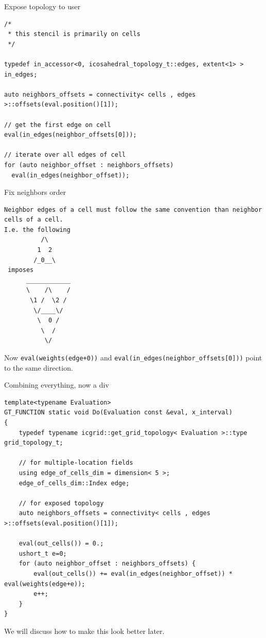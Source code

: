 \documentclass{beamer}
\begin{document}
\begin{frame}[fragile]{Expose topology to user}
  \begin{lstlisting}
/*
 * this stencil is primarily on cells
 */

typedef in_accessor<0, icosahedral_topology_t::edges, extent<1> > in_edges;

auto neighbors_offsets = connectivity< cells , edges >::offsets(eval.position()[1]);

// get the first edge on cell
eval(in_edges(neighbor_offsets[0]));

// iterate over all edges of cell
for (auto neighbor_offset : neighbors_offsets)
  eval(in_edges(neighbor_offset));
  \end{lstlisting}
\end{frame}

\begin{frame}[fragile]{Fix neighbors order}
  \begin{lstlisting}
Neighbor edges of a cell must follow the same convention than neighbor cells of a cell.
I.e. the following
          /\
         1  2
        /_0__\
 imposes
      ____________
      \    /\    /
       \1 /  \2 /
        \/____\/
         \  0 /
          \  /
           \/
  \end{lstlisting}
  Now \texttt{eval(weights(edge+0))} and \texttt{eval(in\_edges(neighbor\_offsets[0]))} point to the same direction.
\end{frame}

\begin{frame}[fragile]{Combining everything, now a div}
\begin{lstlisting}[basicstyle=\scriptsize\ttfamily]
template<typename Evaluation>
GT_FUNCTION static void Do(Evaluation const &eval, x_interval)
{
    typedef typename icgrid::get_grid_topology< Evaluation >::type grid_topology_t;

    // for multiple-location fields
    using edge_of_cells_dim = dimension< 5 >;
    edge_of_cells_dim::Index edge;

    // for exposed topology
    auto neighbors_offsets = connectivity< cells , edges >::offsets(eval.position()[1]);

    eval(out_cells()) = 0.;
    ushort_t e=0;
    for (auto neighbor_offset : neighbors_offsets) {
        eval(out_cells()) += eval(in_edges(neighbor_offset)) * eval(weights(edge+e));
        e++;
    }
}
\end{lstlisting}

  We will discuss how to make this look better later.
\end{frame}
\end{document}
